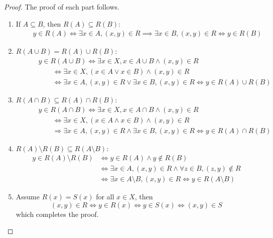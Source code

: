\documentclass[
  letterpaper,
  10pt,
  reqno,
  twopage,
  openany]{book}
\theoremstyle{plain}
\theoremstyle{definition}
\theoremstyle{definition}
\theoremstyle{definition}
\theoremstyle{plain}
\theoremstyle{plain}
\theoremstyle{remark}
\begin{document}
\begin{proof}

The proof of each part follows.

\begin{enumerate}
\def\labelenumi{(\arabic{enumi})}
\item
  If \(A\subseteq B\), then \(R(A)\subseteq R(B)\): \begin{align*}
  \qquad y\in R(A) \Longleftrightarrow \exists x\in A, (x,y)\in R \implies \exists x\in B, (x,y)\in R \Longleftrightarrow y\in R(B)
  \end{align*}
\item
  \(R(A\cup B)=R(A)\cup R(B)\): \begin{align*}
  \qquad & y\in R(A\cup B) \Longleftrightarrow \exists x\in X, x\in A\cup B \land (x,y)\in R  \\ 
  & \qquad \Longleftrightarrow  \exists x\in X, (x\in A \lor x\in B) \land (x,y)\in R \\ 
  & \qquad \Longleftrightarrow  \exists x\in A, (x,y)\in R \lor \exists x\in B, (x,y)\in R \Longleftrightarrow  y\in R(A) \cup R(B)
  \end{align*}
\item
  \(R(A\cap B)\subseteq R(A)\cap R(B)\): \begin{align*}
  \qquad & y\in R(A\cap B) \Longleftrightarrow \exists x\in X, x\in A\cap B \land (x,y)\in R \\ 
  & \qquad \Longleftrightarrow  \exists x\in X, (x\in A \land x\in B) \land (x,y)\in R \\ 
  & \qquad \Longrightarrow  \exists x\in A, (x,y)\in R \land \exists x\in B, (x,y)\in R \Longleftrightarrow  y\in R(A) \cap R(B)
  \end{align*}
\item
  \(R(A)\setminus R(B)\subseteq R(A\setminus B)\): \begin{align*}
  y\in R(A)\setminus R(B) & \Longleftrightarrow y\in R(A)\land y\not\in R(B) \\
  & \Longleftrightarrow \exists x\in A, (x,y)\in R \land \forall z\in B, (z,y)\not\in R \\
  & \Longleftrightarrow \exists x\in A\setminus B, (x,y)\in R \Longleftrightarrow y\in R(A\setminus B) 
  \end{align*}
\item
  Assume \(R(x)=S(x)\) for all \(x\in X\), then \[
  (x,y)\in R \Longleftrightarrow y\in R(x)  \Longleftrightarrow y\in S(x)  \Longleftrightarrow (x,y)\in S
  \] which completes the proof.
\end{enumerate}

\end{proof}
\end{document}
